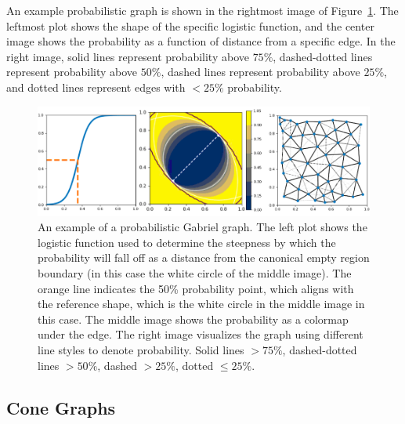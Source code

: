 An example probabilistic graph is shown in the rightmost image of Figure~\ref{fig:probabilistic_beta}.
%
The leftmost plot shows the shape of the specific logistic function, and the center image shows the probability as a function of distance from a specific edge.
%
In the right image, solid lines represent probability above $75\%$, dashed-dotted lines represent probability above $50\%$, dashed lines represent probability above $25\%$, and dotted lines represent edges with $<25\%$ probability.

\begin{figure}[htbp]
    \includegraphics[width=\linewidth]{figs/chap7/probabilistic_beta.png}
    \caption[Example computation of probabilistic Gabriel graph]{An example of a probabilistic Gabriel graph.
    The left plot shows the logistic function used to determine the steepness by which the probability will fall off as a distance from the canonical empty region boundary (in this case the white circle of the middle image).
    The orange line indicates the 50\% probability point, which aligns with the reference shape, which is the white circle in the middle image in this case.
    The middle image shows the probability as a colormap under the edge.
    The right image visualizes the graph using different line styles to denote probability.
    Solid lines $>75\%$, dashed-dotted lines $>50\%$, dashed $>25\%$, dotted $\leq25\%$.}
    \label{fig:probabilistic_beta}
\end{figure}

\subsection{Cone Graphs}

